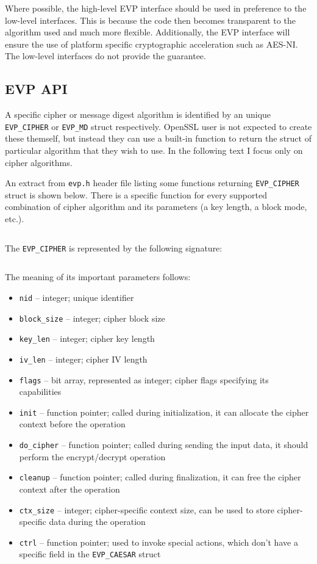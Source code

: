 Where possible, the high-level EVP interface should be used in preference to the low-level interfaces. This is because the code then becomes transparent to the algorithm used and much more flexible. Additionally, the EVP interface will ensure the use of platform specific cryptographic acceleration such as AES-NI. The low-level interfaces do not provide the guarantee.


\subsection{EVP API}
\label{toc/openssl-evp}

A specific cipher or message digest algorithm is identified by an unique \texttt{EVP\_CIPHER} or \texttt{EVP\_MD} struct respectively. OpenSSL user is not expected to create these themself, but instead they can use a built-in function to return the struct of particular algorithm that they wish to use. In the following text I focus only on cipher algorithms.

An extract from \texttt{evp.h} header file listing some functions returning \texttt{EVP\_CIPHER} struct is shown below. There is a specific function for every supported combination of cipher algorithm and its parameters (a key length, a block mode, etc.).

\inputminted{c}{code/openssl-evp-ciphers.c}

The \texttt{EVP\_CIPHER} is represented by the following signature:

\inputminted{c}{code/openssl-evp-cipher.c}

The meaning of its important parameters follows:

\begin{itemize}
  \item \texttt{nid} -- integer; unique identifier
  \item \texttt{block\_size} -- integer; cipher block size
  \item \texttt{key\_len} -- integer; cipher key length
  \item \texttt{iv\_len} -- integer; cipher IV length
  \item \texttt{flags} -- bit array, represented as integer; cipher flags specifying its capabilities
  \item \texttt{init} -- function pointer; called during initialization, it can allocate the cipher context before the operation
  \item \texttt{do\_cipher} -- function pointer; called during sending the input data, it should perform the encrypt/decrypt operation
  \item \texttt{cleanup} -- function pointer; called during finalization, it can free the cipher context after the operation
  \item \texttt{ctx\_size} -- integer; cipher-specific context size, can be used to store cipher-specific data during the operation
  \item \texttt{ctrl} -- function pointer; used to invoke special actions, which don't have a specific field in the \texttt{EVP\_CAESAR} struct
\end{itemize}

